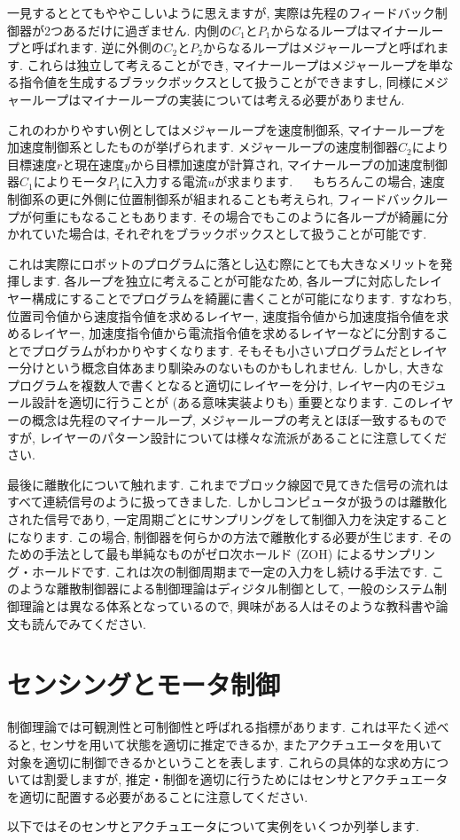 一見するととてもややこしいように思えますが, 実際は先程のフィードバック制御器が2つあるだけに過ぎません. 
内側の$C_1$と$P_1$からなるループはマイナーループと呼ばれます. 
逆に外側の$C_2$と$P_2$からなるループはメジャーループと呼ばれます. 
これらは独立して考えることができ, マイナーループはメジャーループを単なる指令値を生成するブラックボックスとして扱うことができますし, 同様にメジャーループはマイナーループの実装については考える必要がありません. 
\par
これのわかりやすい例としてはメジャーループを速度制御系, マイナーループを加速度制御系としたものが挙げられます. 
メジャーループの速度制御器$C_2$により目標速度$r$と現在速度$y$から目標加速度が計算され, マイナーループの加速度制御器$C_1$によりモータ$P_1$に入力する電流$u$が求まります. 　
もちろんこの場合, 速度制御系の更に外側に位置制御系が組まれることも考えられ, フィードバックループが何重にもなることもあります. 
その場合でもこのように各ループが綺麗に分かれていた場合は, それぞれをブラックボックスとして扱うことが可能です. 
\par
これは実際にロボットのプログラムに落とし込む際にとても大きなメリットを発揮します. 
各ループを独立に考えることが可能なため, 各ループに対応したレイヤー構成にすることでプログラムを綺麗に書くことが可能になります. 
すなわち, 位置司令値から速度指令値を求めるレイヤー, 速度指令値から加速度指令値を求めるレイヤー, 加速度指令値から電流指令値を求めるレイヤーなどに分割することでプログラムがわかりやすくなります. 
そもそも小さいプログラムだとレイヤー分けという概念自体あまり馴染みのないものかもしれません. 
しかし, 大きなプログラムを複数人で書くとなると適切にレイヤーを分け, レイヤー内のモジュール設計を適切に行うことが (ある意味実装よりも) 重要となります. 
このレイヤーの概念は先程のマイナーループ, メジャーループの考えとほぼ一致するものですが, レイヤーのパターン設計については様々な流派があることに注意してください. 
\par
最後に離散化について触れます. 
これまでブロック線図で見てきた信号の流れはすべて連続信号のように扱ってきました. 
しかしコンピュータが扱うのは離散化された信号であり, 一定周期ごとにサンプリングをして制御入力を決定することになります. 
この場合, 制御器を何らかの方法で離散化する必要が生じます. 
そのための手法として最も単純なものがゼロ次ホールド (ZOH) によるサンプリング・ホールドです. 
これは次の制御周期まで一定の入力をし続ける手法です. 
このような離散制御器による制御理論はディジタル制御として, 一般のシステム制御理論とは異なる体系となっているので, 興味がある人はそのような教科書や論文も読んでみてください. 
\section{センシングとモータ制御}
制御理論では可観測性と可制御性と呼ばれる指標があります. これは平たく述べると, センサを用いて状態を適切に推定できるか, またアクチュエータを用いて対象を適切に制御できるかということを表します. これらの具体的な求め方については割愛しますが, 推定・制御を適切に行うためにはセンサとアクチュエータを適切に配置する必要があることに注意してください. 
\par
以下ではそのセンサとアクチュエータについて実例をいくつか列挙します. 
